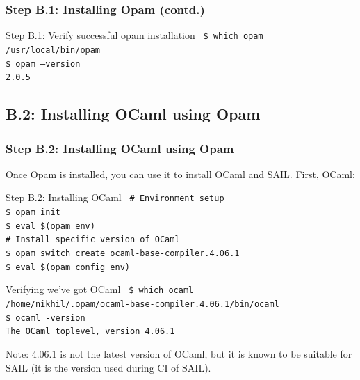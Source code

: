 \documentclass[aspectratio=169]{beamer}
\newcommand{\hm}{\hspace*{1em}}
\newcommand{\scripttt}{\scriptsize\tt}
\begin{document}
\begin{frame}
  \frametitle{Step B.1: Installing Opam (contd.)}

  \begin{block}{Step B.1: Verify successful opam installation}
    {\scripttt
      \hm{}\$ which opam \\
      \hm{}/usr/local/bin/opam \\
      \hm{}\$ opam --version \\
      \hm{}2.0.5 }
  \end{block}

\end{frame}


\subsection{B.2: Installing OCaml using Opam}

\begin{frame}
  \frametitle{Step B.2: Installing OCaml using Opam}

  {\scriptsize Once Opam is installed, you can use it to install OCaml and SAIL.  First, OCaml:}

  \begin{block}{Step B.2: Installing OCaml}
    {\scripttt
      \hm{}\# Environment setup \\
      \hm{}\$ opam init \\
      \hm{}\$ eval \$(opam env) \\
      \hm{}\# Install specific version of OCaml \\
      \hm{}\$ opam switch create ocaml-base-compiler.4.06.1 \\
      \hm{}\$ eval \$(opam config env)
    }
  \end{block}

  \begin{block}{Verifying we've got OCaml}
    {\scripttt
      \hm{}\$ which ocaml \\
      \hm{}/home/nikhil/.opam/ocaml-base-compiler.4.06.1/bin/ocaml \\
      \hm{}\$ ocaml -version \\
      \hm{}The OCaml toplevel, version 4.06.1
    }
  \end{block}

  {\tiny Note: 4.06.1 is not the latest version of OCaml,
    but it is known to be suitable for SAIL (it is the version used during CI of SAIL).}

\end{frame}
\end{document}

